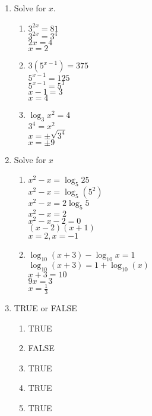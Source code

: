 \documentclass[9pt]{article}
\begin{document}
\begin{enumerate}

	\item Solve for $x$.

	\begin{multicols}{3}			
		\begin{enumerate}
			\item $3^{2x} =  81$ \\
			$3^{2x} =  3^4$ \\ 
			$2x = 4$ \\
			$x = 2$
			\item $3(5^{x-1}) = 375 $ \\ 
			$ 5^{x-1} = 125 $ \\ 
			$5^{x-1} = 5^{3} $ \\ 
			$x-1 = 3$ \\ 
			$x = 4$
			\item $ \log_3 x^2  = 4  $ \\
			$ 3^4  = x^2 $ \\ 
			$x=\pm \sqrt{3^4}$ \\
			$x=\pm 9$
		\end{enumerate}	
	\end{multicols}

	\item Solve for $x$
	\begin{multicols}{2}			
		\begin{enumerate}
			\item $x^2 - x = \log_5 25 $\\
			$x^2 - x = \log_5 (5^2)$\\
			$x^2 - x = 2\log_5 5$\\
			$x^2 - x = 2$\\
			$x^2 - x -2 = 0$\\
			$(x-2)(x+1)$\\
			$x=2,x=-1$

			\item $ \log_{10} (x+3) - \log_{10} x = 1 $\\
			$\log_{10}(x+3)=1+\log_{10}(x)$\\
			$x+3 = 10$\\
			$9x = 3$\\
			$x = \frac{1}{3}$\\
		\end{enumerate}	
	\end{multicols}

	\item TRUE or FALSE
	\begin{multicols}{5}			
		\begin{enumerate}
			\item TRUE
			\item FALSE
			\item TRUE
			\item TRUE
			\item TRUE
		\end{enumerate}	
	\end{multicols}
	
\end{enumerate}
\end{document}
